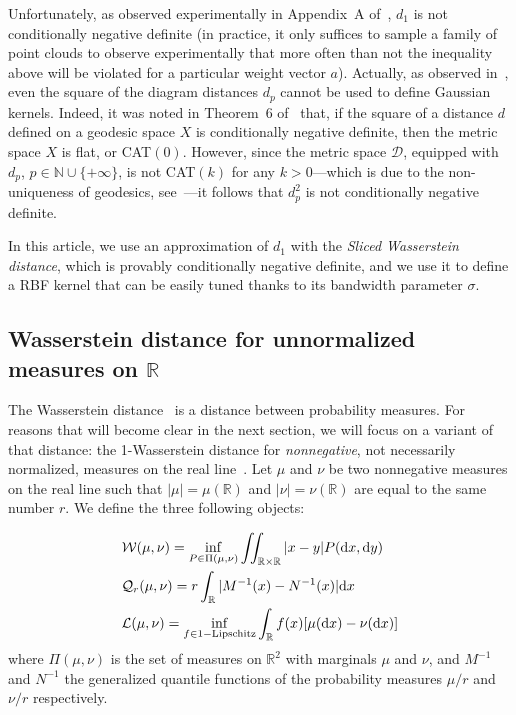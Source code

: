 \documentclass[11pt]{article}
\newcommand{\N}{\mathbb{N}}
\newcommand{\SpD}{{\mathcal D}}
\begin{document}
Unfortunately, as observed experimentally in Appendix~A of~\cite{Reininghaus14}, $d_1$  is not conditionally negative definite (in practice, it only suffices to sample a family of point 
clouds to observe experimentally that more often than not the inequality above will be violated for a particular weight vector $a$).
Actually, as observed in~\cite{Padellini17}, even the square of the diagram distances $d_p$ cannot be used to define Gaussian kernels.
Indeed, it was noted in Theorem~6 of~\cite{Feragen15} that, if the square of a distance $d$ defined on a geodesic space $X$ is conditionally negative definite,
then the metric space $X$ is flat, or CAT$(0)$. However, since the metric space $\SpD$, equipped with $d_p$, $p\in\N\cup\{+\infty\}$, is not CAT$(k)$ for any
$k>0$---which is due to the non-uniqueness of geodesics, see~\cite{Turner14}---it follows that $d_p^2$ is not conditionally negative definite.
 
In this article, we use an approximation of $d_1$ with the {\em Sliced Wasserstein distance}, which is provably 
conditionally negative definite, and we use it to define a RBF kernel that can be easily tuned thanks to its bandwidth parameter $\sigma$.



\subsection{Wasserstein distance for unnormalized measures on $\mathbb{R}$}
\label{sec:wasserstein}
The Wasserstein distance~\cite[\S6]{Villani09} is a distance between probability measures. 
For reasons that will become clear in the next section, we will focus on a variant of that distance: 
the 1-Wasserstein distance for \emph{nonnegative}, not necessarily normalized, measures on the real line~\cite[\S2]{Santambrogio15}. 
Let $\mu$ and $\nu$ be two nonnegative measures on the real line such that 
$|\mu|=\mu(\mathbb{R})$ and $|\nu|=\nu(\mathbb{R})$ are equal to the same number $r$. 
We define the three following objects:

\begin{align}
&\mathcal{W}(\mu,\nu)=\inf_{P\in\Pi(\mu,\nu)} \iint_{\mathbb{R}\times\mathbb{R}} |x-y| P({\rm d}x,{\rm d}y)\label{eq:optimal}\\
&\mathcal{Q}_r(\mu,\nu)=r \int_{\mathbb{R}} | M^{-1}(x)- N^{-1}(x)| {\rm d}x\label{eq:quantile}\\
&\mathcal{L}(\mu,\nu)=\inf_{f\in 1-\text{Lipschitz}}\int_{\mathbb{R}} f(x) [\mu({\rm d}x)-\nu({\rm d}x)]\label{eq:Kanto}
\end{align}
where $\Pi(\mu,\nu)$ is the set of measures on $\mathbb{R}^2$ with marginals $\mu$ and $\nu$, 
and $M^{-1}$ and $N^{-1}$ the generalized quantile functions of the probability measures $\mu/r$ and $\nu/r$ respectively. 
\end{document}
